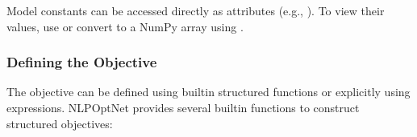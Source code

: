\documentclass[letterpaper,10pt,english,openany,oneside]{sphinxmanual}
\begin{document}
\begin{sphinxVerbatim}[commandchars=\\\{\}]
  \PYG{p}{[}\PYG{p}{[} \PYG{p}{]} \PYG{p}{[} \PYG{p}{]}\PYG{p}{]}
  \PYG{p}{[}\PYG{p}{[} \PYG{p}{]} \PYG{p}{[} \PYG{p}{]}\PYG{p}{]}

  \PYG{p}{[} \PYG{p}{]}

  \PYG{p}{[}
    \PYG{p}{[}\PYG{p}{[} \PYG{p}{]} \PYG{p}{[} \PYG{p}{]}\PYG{p}{]}
    \PYG{p}{[}\PYG{p}{[} \PYG{p}{]} \PYG{p}{[} \PYG{p}{]}\PYG{p}{]}
\PYG{p}{]}
\end{sphinxVerbatim}

\sphinxAtStartPar
Model constants can be accessed directly as attributes (e.g., ). To view their values, use  or convert to a NumPy array using .


\subsubsection{Defining the Objective}
\label{\detokenize{user-guide/defining-the-problem:defining-the-objective}}
\sphinxAtStartPar
The objective can be defined using built\sphinxhyphen{}in structured functions or explicitly using expressions. NLPOpt\sphinxhyphen{}Net provides several built\sphinxhyphen{}in functions to construct structured objectives:
\end{document}
